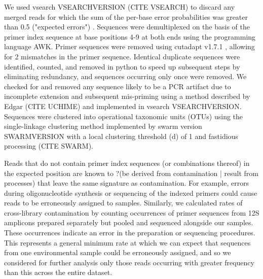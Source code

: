 \documentclass[11pt,letterpaper]{article} %
\begin{document}
We used vsearch VSEARCHVERSION (CITE VSEARCH) to discard any merged reads for which the sum of the per-base error probabilities was greater than 0.5 ("expected errors") \cite{Edgar2010}.
Sequences were demultiplexed on the basis of the primer index sequence at base positions 4-9 at both ends using the programming language AWK.
Primer sequences were removed using cutadapt v1.7.1 \cite{Martin2011}, allowing for 2 mismatches in the primer sequence.
Identical duplicate sequences were identified, counted, and removed in python to speed up subsequent steps by eliminating redundancy, and sequences occurring only once were removed.
We checked for and removed any sequence likely to be a PCR artifact due to incomplete extension and subsequent mis-priming using a method described by Edgar (CITE UCHIME\cite{Edgar2010}) and implemented in vsearch VSEARCHVERSION.
Sequences were clustered into operational taxonomic units (OTUs) using the single-linkage clustering method implemented by swarm version SWARMVERSION with a local clustering threshold (d) of 1 and fastidious processing (CITE SWARM).

Reads that do not contain primer index sequences (or combinations thereof) in the expected position are known to ?(be derived from contamination | result from processes) that leave the same signature as contamination.
For example, errors during oligonucleotide synthesis or sequencing of the indexed primers could cause reads to be erroneously assigned to samples.
Similarly, we calculated rates of cross-library contamination by counting occurrences of primer sequences from 12S amplicons prepared separately but pooled and sequenced alongside our samples.
These occurrences indicate an error in the preparation or sequencing procedures.
This represents a general minimum rate at which we can expect that sequences from one environmental sample could be erroneously assigned, and so we considered for further analysis only those reads occurring with greater frequency than this across the entire dataset.
\end{document}
